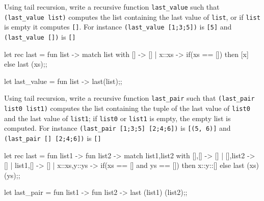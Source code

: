 

\renewcommand\AUTHOR{nweadick1@cougars.ccis.edu} %


\topmattertwo


\nextq
Using tail recursion,
write a recursive function
\verb!last_value! such that
\verb!(last_value list)! computes the list containing the last value
of \verb!list!, or if \verb!list! is empty it computes \verb![]!.
For instance \verb!(last_value [1;3;5])! is \verb![5]!
and \verb!(last_value [])! is \verb![]!
\\
\ANSWER
\begin{answercode}
let rec last = fun list -> match list with [] -> [] 
| x::xs -> if(xs == []) then [x] else last (xs);;
\end{answercode}
\begin{answercode}
let last_value = fun list -> last(list);;
\end{answercode}

\nextq
Using tail recursion,
write a recursive function
\verb!last_pair! such that
\verb!(last_pair list0 list1)! computes the list containing the
tuple of the last value of \verb!list0! and the last value of \verb!list1!;
if \verb!list0! or \verb!list1! is empty, the empty list is computed.
For instance \verb!(last_pair [1;3;5] [2;4;6])! is \verb![(5, 6)]!
and \verb!(last_pair [] [2;4;6])! is \verb![]!
\\
\ANSWER
\begin{answercode}
let rec last = fun list1 -> fun list2 -> match list1,list2 with [],[] -> [] 
| [],list2 -> [] 
| list1,[] -> [] 
| x::xs,y::ys -> if(xs == [] and ys == []) then x::y::[] else last (xs) (ys);;
\end{answercode}

\begin{answercode}
let last_pair = fun list1 -> fun list2 -> last (list1) (list2);;
\end{answercode}

\newpage



